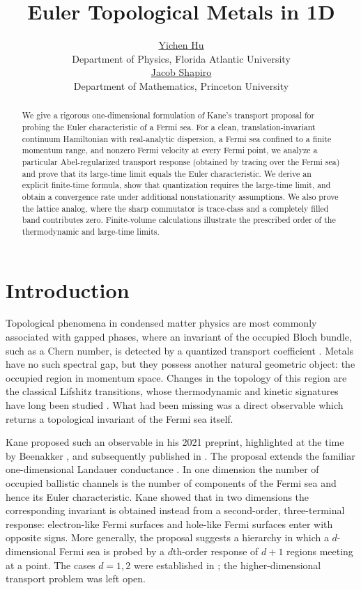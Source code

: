 \documentclass[a4paper,10pt]{article}
\title{Euler Topological Metals in 1D}
\author{\href{mailto:jc1220@math.princeton.edu}{Yichen Hu}\\
	{\footnotesize Department of Physics, Florida Atlantic University}\\
	\href{mailto:shapiro@math.princeton.edu}{Jacob Shapiro}\\
	{\footnotesize Department of Mathematics, Princeton University}
}
\makeatletter
\newcommand{\reqnomode}{\tagsleft@false\let\veqno\@@eqno}
\numberwithin{equation}{section}
\theoremstyle{plain}
\theoremstyle{plain}
\theoremstyle{plain}
\theoremstyle{plain}
\theoremstyle{plain}
\theoremstyle{remark}
\theoremstyle{definition}
\theoremstyle{plain}
\makeatother
\begin{document}
	\reqnomode
	
	\maketitle
	\begin{abstract}
		We give a rigorous one-dimensional formulation of Kane's transport proposal for probing the Euler characteristic of a Fermi sea. For a clean, translation-invariant continuum Hamiltonian with real-analytic dispersion, a Fermi sea confined to a finite momentum range, and nonzero Fermi velocity at every Fermi point, we analyze a particular Abel-regularized transport response (obtained by tracing over the Fermi sea) and prove that its large-time limit equals the Euler characteristic. We derive an explicit finite-time formula, show that quantization requires the large-time limit, and obtain a convergence rate under additional nonstationarity assumptions. We also prove the lattice analog, where the sharp commutator is trace-class and a completely filled band contributes zero. Finite-volume calculations illustrate the prescribed order of the thermodynamic and large-time limits.
	\end{abstract}
	\section{Introduction}
    Topological phenomena in condensed matter physics are most commonly
    associated with gapped phases, where an invariant of the occupied Bloch
    bundle, such as a Chern number, is detected by a quantized transport
    coefficient \cite{Hasan_Kane_2010}. Metals have no such spectral gap, but
    they possess another natural geometric object: the occupied region in
    momentum space. Changes in the topology of this region are the classical
    Lifshitz transitions, whose thermodynamic and kinetic signatures have long
    been studied \cite{Lifshitz1960,BlanterEtAl1994}. What had been missing was
    a direct observable which returns a topological invariant of the Fermi sea
    itself.

    Kane proposed such an observable in his 2021 preprint, highlighted at the
    time by Beenakker \cite{Beenakker2021Euler}, and subsequently published in
    \cite{Kane_22_PhysRevLett.128.076801}. The proposal extends the familiar
    one-dimensional Landauer conductance \cite{Landauer1957}. In one dimension
    the number of occupied ballistic channels is the number of components of
    the Fermi sea and hence its Euler characteristic. Kane showed that in two
    dimensions the corresponding invariant is obtained instead from a
    second-order, three-terminal response: electron-like Fermi surfaces and
    hole-like Fermi surfaces enter with opposite signs. More generally, the
    proposal suggests a hierarchy in which a $d$-dimensional Fermi sea is
    probed by a $d$th-order response of $d+1$ regions meeting at a point. The
    cases $d=1,2$ were established in \cite{Kane_22_PhysRevLett.128.076801};
    the higher-dimensional transport problem was left open.
\end{document}
